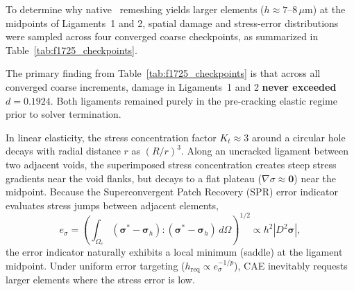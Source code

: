 To determine why native \MISESERI\ remeshing yields larger elements ($h \approx 7$--$8\,\mu\mathrm{m}$) at the midpoints of Ligaments~1 and 2, spatial damage and stress-error distributions were sampled across four converged coarse checkpoints, as summarized in Table~\ref{tab:f1725_checkpoints}.

\begin{table}[htbp]
\centering
\small
\caption{Evolution of maximum phase-field damage parameter $d_{\max}$ and native \MISESERI\ error across the four coarse simulation checkpoints on \texttt{PK\_F1720\_COARSE\_COUPLED}.}
\label{tab:f1725_checkpoints}
\end{table}

The primary finding from Table~\ref{tab:f1725_checkpoints} is that across all converged coarse increments, damage in Ligaments~1 and 2 \textbf{never exceeded $d = 0.1924$}. Both ligaments remained purely in the pre-cracking elastic regime prior to solver termination.

In linear elasticity, the stress concentration factor $K_t \approx 3$ around a circular hole decays with radial distance $r$ as $(R/r)^3$. Along an uncracked ligament between two adjacent voids, the superimposed stress concentration creates steep stress gradients near the void flanks, but decays to a flat plateau ($\nabla \sigma \approx \mathbf{0}$) near the midpoint. Because the Superconvergent Patch Recovery (SPR) error indicator evaluates stress jumps between adjacent elements,
\begin{equation}
  e_\sigma = \left( \int_{\Omega_e} (\boldsymbol{\sigma}^* - \boldsymbol{\sigma}_h) : (\boldsymbol{\sigma}^* - \boldsymbol{\sigma}_h) \, d\Omega \right)^{1/2} \propto h^2 |D^2 \boldsymbol{\sigma}|,
  \label{eq:spr_error_scaling}
\end{equation}
the error indicator naturally exhibits a local minimum (saddle) at the ligament midpoint. Under uniform error targeting ($h_{\mathrm{req}} \propto e_\sigma^{-1/p}$), \Abaqus CAE inevitably requests larger elements where the stress error is low.


